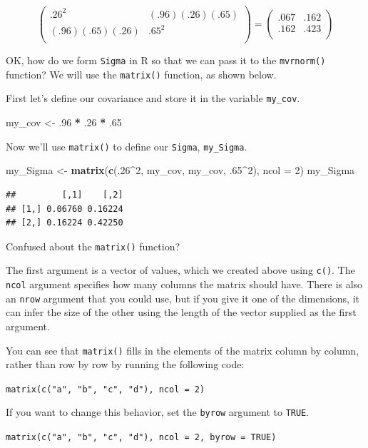 \documentclass[]{book}
\newenvironment{Shaded}{\begin{snugshade}}{\end{snugshade}}
\newcommand{\DataTypeTok}[1]{\textcolor[rgb]{0.13,0.29,0.53}{#1}}
\newcommand{\DecValTok}[1]{\textcolor[rgb]{0.00,0.00,0.81}{#1}}
\newcommand{\FloatTok}[1]{\textcolor[rgb]{0.00,0.00,0.81}{#1}}
\newcommand{\KeywordTok}[1]{\textcolor[rgb]{0.13,0.29,0.53}{\textbf{#1}}}
\newcommand{\NormalTok}[1]{#1}
\newcommand{\OperatorTok}[1]{\textcolor[rgb]{0.81,0.36,0.00}{\textbf{#1}}}
\newcommand{\StringTok}[1]{\textcolor[rgb]{0.31,0.60,0.02}{#1}}
\begin{document}
\[
\begin{pmatrix}
.26^2 & (.96)(.26)(.65) \\
(.96)(.65)(.26) & .65^2 \\
\end{pmatrix} =
\begin{pmatrix}
.067 & .162 \\
.162 & .423 \\
\end{pmatrix}
\]

OK, how do we form \texttt{Sigma} in R so that we can pass it to the \texttt{mvrnorm()} function? We will use the \texttt{matrix()} function, as shown below.

First let's define our covariance and store it in the variable \texttt{my\_cov}.

\begin{Shaded}
\begin{Highlighting}[]
\NormalTok{my_cov <-}\StringTok{ }\FloatTok{.96} \OperatorTok{*}\StringTok{ }\FloatTok{.26} \OperatorTok{*}\StringTok{ }\FloatTok{.65}
\end{Highlighting}
\end{Shaded}

Now we'll use \texttt{matrix()} to define our \texttt{Sigma}, \texttt{my\_Sigma}.

\begin{Shaded}
\begin{Highlighting}[]
\NormalTok{my_Sigma <-}\StringTok{ }\KeywordTok{matrix}\NormalTok{(}\KeywordTok{c}\NormalTok{(.}\DecValTok{26}\OperatorTok{^}\DecValTok{2}\NormalTok{, my_cov, my_cov, }\FloatTok{.65}\OperatorTok{^}\DecValTok{2}\NormalTok{), }\DataTypeTok{ncol =} \DecValTok{2}\NormalTok{)}
\NormalTok{my_Sigma}
\end{Highlighting}
\end{Shaded}

\begin{verbatim}
##         [,1]    [,2]
## [1,] 0.06760 0.16224
## [2,] 0.16224 0.42250
\end{verbatim}

\begin{info}
Confused about the \texttt{matrix()} function?

The first argument is a vector of values, which we created above using
\texttt{c()}. The \texttt{ncol} argument specifies how many columns the
matrix should have. There is also an \texttt{nrow} argument that you
could use, but if you give it one of the dimensions, it can infer the
size of the other using the length of the vector supplied as the first
argument.

You can see that \texttt{matrix()} fills in the elements of the matrix
column by column, rather than row by row by running the following code:

\texttt{matrix(c("a",\ "b",\ "c",\ "d"),\ ncol\ =\ 2)}

If you want to change this behavior, set the \texttt{byrow} argument to
\texttt{TRUE}.

\texttt{matrix(c("a",\ "b",\ "c",\ "d"),\ ncol\ =\ 2,\ byrow\ =\ TRUE)}
\end{info}
\end{document}
